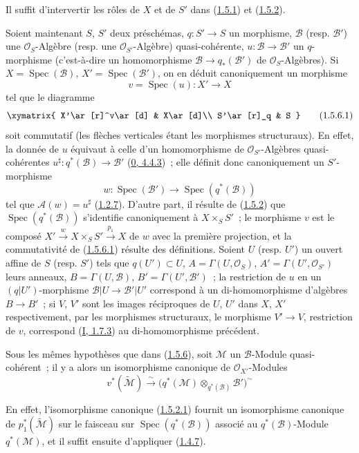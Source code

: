 Il suffit d'intervertir les rôles de $X$ et de $S'$ dans
(\hyperref[II.1.5.1-fr]{1.5.1}) et
(\hyperref[II.1.5.2-fr]{1.5.2}).

\begin{env}[1.5.6]
\label{II.1.5.6-fr}
Soient maintenant $S$, $S'$ deux préschémas, $q:S'\to S$ un morphisme,
$\mathcal{B}$ (resp. $\mathcal{B}'$) une $\mathcal{O}_S$-Algèbre (resp. une
$\mathcal{O}_{S'}$-Algèbre) quasi-cohérente, $u:\mathcal{B}\to\mathcal{B}'$
un $q$-morphisme (c'est-à-dire un homomorphisme
$\mathcal{B}\to q_*(\mathcal{B}')$ de $\mathcal{O}_S$-Algèbres). Si
$X=\operatorname{Spec}(\mathcal{B})$,
$X'=\operatorname{Spec}(\mathcal{B}')$, on en déduit canoniquement un
morphisme
\[
  v=\operatorname{Spec}(u):X'\to X
\]
tel que le diagramme
\[
  \xymatrix{
    X'\ar[r]^v\ar[d] & X\ar[d]\\
    S'\ar[r]_q & S
  }
  \tag{1.5.6.1}\label{II.1.5.6.1-fr}
\]
soit commutatif (les flèches verticales étant les morphismes structuraux). En
effet, la donnée de $u$ équivaut à celle d'un homomorphisme de
$\mathcal{O}_{S'}$-Algèbres quasi-cohérentes
$u^\sharp:q^*(\mathcal{B})\to\mathcal{B}'$
(\hyperref[0.4.4.3-fr]{0, 4.4.3})~; elle définit donc canoniquement un
$S'$-morphisme
\[
  w:\operatorname{Spec}(\mathcal{B}')\to
  \operatorname{Spec}(q^*(\mathcal{B}))
\]
tel que $\mathcal{A}(w)=u^\sharp$
(\hyperref[II.1.2.7-fr]{1.2.7}). D'autre part, il résulte de
(\hyperref[II.1.5.2-fr]{1.5.2}) que
$\operatorname{Spec}(q^*(\mathcal{B}))$ s'identifie canoniquement à
$X\times_S S'$~; le morphisme $v$ est le composé
$X'\xrightarrow{w}X\times_S S'\xrightarrow{p_1}X$ de $w$ avec la première
projection, et la commutativité de
(\hyperref[II.1.5.6.1-fr]{1.5.6.1}) résulte des définitions. Soient $U$ (resp.
$U'$) un ouvert affine de $S$ (resp. $S'$) tels que $q(U')\subset U$,
$A=\Gamma(U,\mathcal{O}_S)$, $A'=\Gamma(U',\mathcal{O}_{S'})$ leurs anneaux,
$B=\Gamma(U,\mathcal{B})$, $B'=\Gamma(U',\mathcal{B}')$~; la restriction de
$u$ en un $(q|U')$-morphisme
$\mathcal{B}|U\to\mathcal{B}'|U'$ correspond à un di-homomorphisme d'algèbres
$B\to B'$~; si $V$, $V'$ sont les images réciproques de $U$, $U'$ dans $X$,
$X'$ respectivement, par les morphismes structuraux, le morphisme $V'\to V$,
restriction de $v$, correspond (\hyperref[I.1.7.3-fr]{I, 1.7.3}) au
di-homomorphisme précédent.
\end{env}

\begin{env}[1.5.7]
\label{II.1.5.7-fr}
Sous les mêmes hypothèses que dans (\hyperref[II.1.5.6-fr]{1.5.6}), soit
$\mathcal{M}$ un $\mathcal{B}$-Module quasi-cohérent~; il y a alors un
isomorphisme canonique de $\mathcal{O}_{X'}$-Modules
\[
  v^*(\widetilde{\mathcal{M}})\xrightarrow{\sim}
  \bigl(q^*(\mathcal{M})\otimes_{q^*(\mathcal{B})}\mathcal{B}'\bigr)^{\sim}
  \tag{1.5.7.1}\label{II.1.5.7.1-fr}
\]

En effet, l'isomorphisme canonique
(\hyperref[II.1.5.2.1-fr]{1.5.2.1}) fournit un isomorphisme canonique de
$p_1^*(\widetilde{\mathcal{M}})$ sur le faisceau sur
$\operatorname{Spec}(q^*(\mathcal{B}))$ associé au
$q^*(\mathcal{B})$-Module $q^*(\mathcal{M})$, et il suffit ensuite d'appliquer
(\hyperref[II.1.4.7-fr]{1.4.7}).
\end{env}

